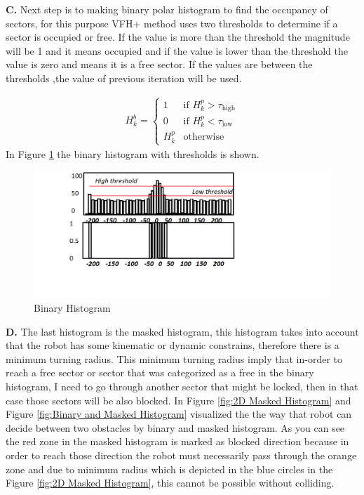 \noindent \textbf{ C. } Next step is to making binary polar histogram to find the occupancy of sectors, for this purpose VFH+ method uses two thresholds to determine if a sector is occupied or free. If the value is more than the threshold the magnitude will be 1 and it means occupied and if the value is lower than the threshold the value is zero and means it is a free sector. If the values are between the thresholds ,the value of previous iteration will be used.  

\begin{equation}
\begin{aligned}
H_k^b = \begin{cases} 
1 & \text{if } H_k^p > \tau_{\text{high}} \\
0 & \text{if } H_k^p < \tau_{\text{low}} \\
H_k^p & \text{otherwise}
\end{cases}
\end{aligned}
\label{eqn:Speed Control}
\end{equation} 
In Figure \ref{fig:Binary Histogram} the binary histogram with thresholds is shown. 
\begin{figure}[H]
  \centering
  \includegraphics[width= 1.5\textwidth]{Figures/Binary histogram.png}
  \caption[Binary Histogram]{Binary Histogram}
   \label{fig:Binary Histogram} 
\end{figure}

\noindent \textbf{ D. }  The last histogram is the masked histogram, this histogram takes into account that the robot has some kinematic or dynamic constrains, therefore there is a minimum turning radius. This minimum turning radius imply that in-order to reach a free sector or sector that was categorized as a free in the binary histogram, I need to go through another sector that might be locked, then in that case those sectors will be also blocked. In Figure \ref{fig:2D Masked Histogram} and Figure \ref{fig:Binary and Masked Histogram}  visualized the the way that robot can decide between two obstacles by binary and masked histogram. As you can see the red zone in the masked histogram is marked as blocked direction because in order to reach those direction the robot must necessarily pass through the orange zone and due to minimum radius which is depicted in the blue circles in the  Figure \ref{fig:2D Masked Histogram}, this cannot be possible without colliding.   

